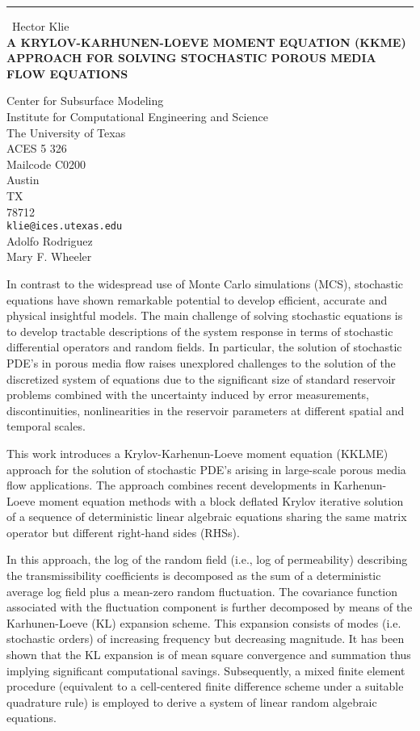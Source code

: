 \documentclass{report}
\begin{document}
\begin{center}
\rule{6in}{1pt} \
{\large Hector Klie \\
{\bf A KRYLOV-KARHUNEN-LOEVE MOMENT EQUATION (KKME) APPROACH FOR SOLVING STOCHASTIC POROUS MEDIA FLOW EQUATIONS}}

Center for Subsurface Modeling \\ Institute for Computational Engineering and Science \\ The University of Texas \\ ACES 5 326 \\ Mailcode C0200 \\ Austin \\ TX \\ 78712
\\
{\tt klie@ices.utexas.edu}\\
Adolfo Rodriguez \\
Mary F. Wheeler\end{center}

In contrast to the widespread use of Monte Carlo simulations (MCS),
stochastic equations have shown remarkable potential to develop
efficient, accurate and physical insightful models. The main challenge of
solving stochastic equations is to develop tractable descriptions of the
system response in terms of stochastic differential operators and random
fields. In particular, the solution of stochastic PDE's in porous media
flow raises unexplored challenges to the solution of the discretized
system of equations due to the significant size of standard reservoir
problems combined with the uncertainty induced by error measurements,
discontinuities, nonlinearities in the reservoir parameters at different
spatial and temporal scales.

This work introduces a Krylov-Karhenun-Loeve moment equation (KKLME)
approach for the solution of stochastic PDE's arising in large-scale
porous media flow applications. The approach combines recent developments
in Karhenun-Loeve moment equation methods with a block deflated Krylov
iterative solution of a sequence of deterministic linear algebraic
equations sharing the same matrix operator but different right-hand sides
(RHSs).

In this approach, the log of the random field (i.e., log of permeability)
describing the transmissibility coefficients is decomposed as the sum of
a deterministic average log field plus a mean-zero random fluctuation.
The covariance function associated with the fluctuation component is
further decomposed by means of the Karhunen-Loeve (KL) expansion scheme.
This expansion consists of modes (i.e. stochastic orders) of increasing
frequency but decreasing magnitude. It has been shown that the KL
expansion is of mean square convergence and summation thus implying
significant computational savings. Subsequently, a mixed finite element
procedure (equivalent to a cell-centered finite difference scheme under a
suitable quadrature rule) is employed to derive a system of linear random
algebraic equations.
\end{document}
